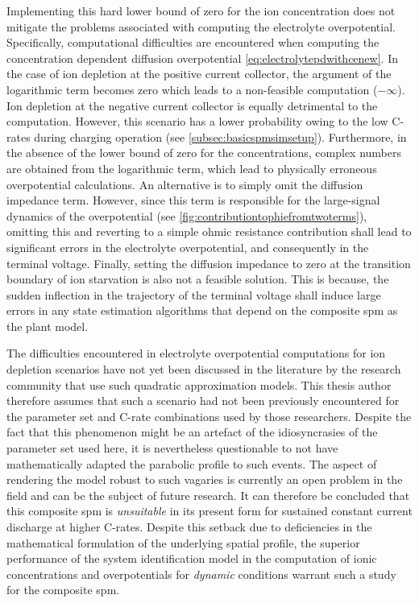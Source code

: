 Implementing  this  hard   lower  bound  of  zero  for   the  ion  concentration
does    not   mitigate    the   problems    associated   with    computing   the
electrolyte   overpotential.   Specifically,  computational   difficulties   are
encountered    when   computing    the    concentration   dependent    diffusion
overpotential \cref{eq:electrolytepdwithcenew}. In the case  of ion depletion at
the positive  current collector,  the argument of  the logarithmic  term becomes
zero which leads to a non-feasible computation ($-\infty$). Ion depletion at the
negative current collector  is equally detrimental to  the computation. However,
this scenario has  a lower probability owing to the  low C-rates during charging
operation (see \cref{subsec:basicspmsimsetup}).  Furthermore, in the  absence of
the lower  bound of zero  for the  concentrations, complex numbers  are obtained
from  the logarithmic  term, which  lead to  physically erroneous  overpotential
calculations. An  alternative is  to simply omit  the diffusion  impedance term.
However, since  this term is  responsible for  the large-signal dynamics  of the
overpotential (see \cref{fig:contributiontophiefromtwoterms}), omitting this and
reverting to  a simple ohmic  resistance contribution shall lead  to significant
errors  in  the electrolyte  overpotential,  and  consequently in  the  terminal
voltage.  Finally, setting  the diffusion  impedance to  zero at  the transition
boundary of ion starvation is also not a feasible solution. This is because, the
sudden inflection in  the trajectory of the terminal voltage  shall induce large
errors in any state estimation algorithms that depend on the composite \gls{spm}
as the plant model.

The  difficulties  encountered  in electrolyte  overpotential  computations  for
ion  depletion scenarios  have  not  yet been  discussed  in  the literature  by
the  research  community that  use  such  quadratic approximation  models.  This
thesis author  therefore assumes that  such a  scenario had not  been previously
encountered  for  the  parameter  set  and C-rate  combinations  used  by  those
researchers. Despite the  fact that this phenomenon might be  an artefact of the
idiosyncrasies of the  parameter set used here, it  is nevertheless questionable
to not  have mathematically adapted  the parabolic  profile to such  events. The
aspect  of rendering  the model  robust to  such vagaries  is currently  an open
problem in the field and can be the subject of future research. It can therefore
be concluded that  this composite \gls{spm} is \emph{unsuitable}  in its present
form for  sustained constant current  discharge at higher C-rates.  Despite this
setback due  to deficiencies in  the mathematical formulation of  the underlying
spatial profile, the superior performance  of the system identification model in
the computation  of ionic  concentrations and overpotentials  for \emph{dynamic}
conditions warrant such a study for the composite \gls{spm}.

